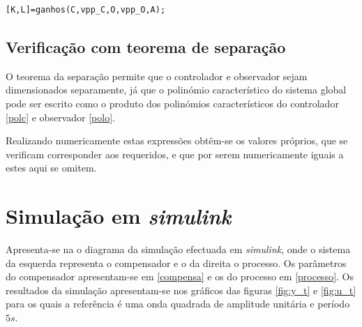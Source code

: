 \documentclass[%
  reprint,
  nofootinbib,
  amsmath,amssymb,
  aps,
  10pt,
  a4paper
]{revtex4-1}
\begin{document}
\begin{lstlisting}[label=list2, caption={Código {\it matlab} para o cálculo dos ganhos $K$ do controlador e $L$ do observador a partir das matrizes de controlabilidade $\mathcal{C}$, observabilidade $\mathcal{O}$ e da dinâmica $A$, e os valores próprios desejados para o controlador $vpp\_C$ e observador $vpp\_O$. A função {\it ganhos} apresenta-se em anexo no ficheiro com o mesmo nome.}]
[K,L]=ganhos(C,vpp_C,O,vpp_O,A);
\end{lstlisting}
\subsection{Verificação com teorema de separação}

O teorema da separação permite que o controlador e observador sejam dimensionados separamente, já que o polinómio característico do sistema global pode ser escrito como o produto dos polinómios característicos do controlador \eqref{polc} e observador \eqref{polo}.

Realizando numericamente estas expressões obtêm-se os valores próprios, que se verificam corresponder aos requeridos, e que por serem numericamente iguais a estes aqui se omitem.



\section{Simulação em {\it simulink}}

Apresenta-se na  o diagrama da simulação efectuada em {\it simulink}, onde o sistema da esquerda representa o compensador e o da direita o processo. Os parâmetros do compensador apresentam-se em \eqref{compensa} e os do processo em \eqref{processo}.
Os resultados da simulação apresentam-se nos gráficos das figuras \ref{fig:y_t} e \ref{fig:u_t} para os quais a referência é uma onda quadrada de amplitude unitária e período $5s$.
\end{document}

